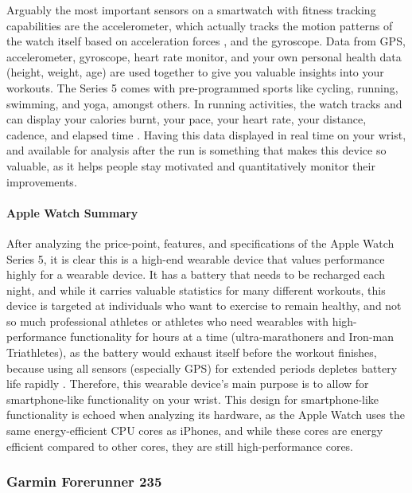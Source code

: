 Arguably the most important sensors on a smartwatch with fitness tracking capabilities are the accelerometer,
which actually tracks the motion patterns of the watch itself based on acceleration forces \cite{accel_expl},
and the gyroscope. Data from GPS, accelerometer, gyroscope, heart rate monitor, and your own personal 
health data (height, weight, age) are
used together to give you valuable insights into your workouts. The Series 5 comes with pre-programmed
sports like cycling, running, swimming, and yoga, amongst others. In running activities, the watch
tracks and can display your calories burnt, your pace, your heart rate, your distance, cadence, and
elapsed time \cite{apple_fitness}. Having this data displayed in real time on your wrist, and available for analysis after the
run is something that makes this device so valuable, as it helps people stay motivated and quantitatively
monitor their improvements.

\paragraph{Apple Watch Summary}
After analyzing the price-point, features, and specifications of the Apple Watch Series 5, it is clear
this is a high-end wearable device that values performance highly for a wearable device. It has a battery
that needs to be recharged each night, and while it carries valuable statistics for many different workouts,
this device is targeted at individuals who want to exercise to remain healthy, and not so much professional
athletes or athletes who need wearables with high-performance functionality for hours at a time (ultra-marathoners and
Iron-man Triathletes), as the battery would exhaust itself before the workout finishes, because using all sensors
(especially GPS) for extended periods depletes battery life rapidly \cite{apple_battery}. Therefore, this
wearable device's main purpose is to allow for smartphone-like functionality on your wrist. This design
for smartphone-like functionality is echoed when analyzing its hardware, as the Apple Watch
uses the same energy-efficient CPU cores as iPhones, and while these cores are energy efficient
compared to other cores, they are still high-performance cores.

\subsubsection{Garmin Forerunner 235}
